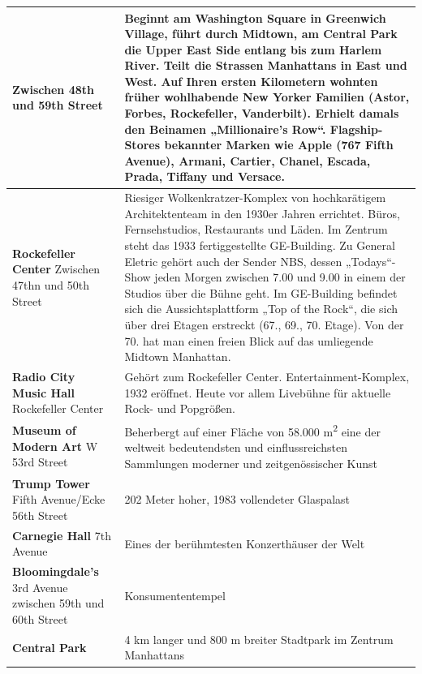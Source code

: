 \documentclass[fontsize=14pt,a4paper,headinclude,DIV=calc,automark]{scrbook}
\begin{document}
{\begin{longtable}{
    >{\raggedright\arraybackslash\columncolor{tablecellblue}}p{5.1cm}
    >{\raggedright\arraybackslash\columncolor{rightcolumn}}p{10cm}
    }
    Zwischen 48th und 59th Street & Beginnt am Washington Square in Greenwich Village, führt durch Midtown, am Central Park die Upper East Side entlang bis zum Harlem River. Teilt die Strassen Manhattans in East und West. Auf Ihren ersten Kilometern wohnten früher wohlhabende New Yorker Familien (Astor, Forbes, Rockefeller, Vanderbilt). Erhielt damals den Beinamen „Millionaire’s Row“. Flagship-Stores bekannter Marken wie Apple (767 Fifth Avenue), Armani, Cartier, Chanel, Escada, Prada, Tiffany und Versace. \\ \midrule
    \textbf{Rockefeller Center}\newline
    Zwischen 47thn und 50th Street & Riesiger Wolkenkratzer-Komplex von hochkarätigem Architektenteam in den 1930er Jahren errichtet. Büros, Fernsehstudios, Restaurants und Läden. Im Zentrum steht das 1933 fertiggestellte GE-Building. Zu General Eletric gehört auch der Sender NBS, dessen „Todays“-Show jeden Morgen zwischen 7.00 und 9.00 in einem der Studios über die Bühne geht. Im GE-Building befindet sich die Aussichtsplattform „Top of the Rock“, die sich über drei Etagen erstreckt (67., 69., 70. Etage). Von der 70. hat man einen freien Blick auf das umliegende Midtown Manhattan. \\ \midrule
    \textbf{Radio City Music Hall}\newline
    Rockefeller Center & Gehört zum Rockefeller Center. Entertainment-Komplex, 1932 eröffnet. Heute vor allem Livebühne für aktuelle Rock- und Popgrößen. \\ \midrule
    \textbf{Museum of Modern Art}\newline
    11 W 53rd Street & Beherbergt auf einer Fläche von 58.000 m\textsuperscript{2} eine der weltweit bedeutendsten und einflussreichsten Sammlungen moderner und zeitgenössischer Kunst \\ \midrule
    \textbf{Trump Tower}\newline
    Fifth Avenue/Ecke 56th Street & 202 Meter hoher, 1983 vollendeter Glaspalast \\ \midrule
    \textbf{Carnegie Hall}\newline
    881 7th Avenue & Eines der berühmtesten Konzerthäuser der Welt \\ \midrule
    \textbf{Bloomingdale’s}\newline
    3rd Avenue zwischen 59th und 60th Street & Konsumententempel \\ \midrule
    \textbf{Central Park}\newline
     & 4 km langer und 800 m breiter Stadtpark im Zentrum Manhattans \\ \midrule

\end{longtable}}
\end{document}
